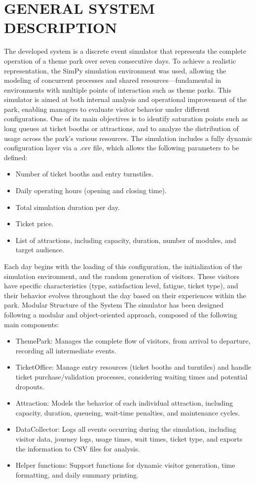 \documentclass[12pt]{article}
\begin{document}
\section{GENERAL SYSTEM DESCRIPTION}
The developed system is a discrete event simulator that represents the complete operation of a theme park over seven consecutive days. To achieve a realistic representation, the SimPy simulation environment was used, allowing the modeling of concurrent processes and shared resources—fundamental in environments with multiple points of interaction such as theme parks.
This simulator is aimed at both internal analysis and operational improvement of the park, enabling managers to evaluate visitor behavior under different configurations. One of its main objectives is to identify saturation points such as long queues at ticket booths or attractions, and to analyze the distribution of usage across the park’s various resources.
The simulation includes a fully dynamic configuration layer via a .csv file, which allows the following parameters to be defined: 

\begin{itemize}
\item  Number of ticket booths and entry turnstiles.
\item  Daily operating hours (opening and closing time).
\item  Total simulation duration per day.
\item  Ticket price.
\item  List of attractions, including capacity, duration, number of modules, and target audience.
\end{itemize}

Each day begins with the loading of this configuration, the initialization of the simulation environment, and the random generation of visitors. These visitors have specific characteristics (type, satisfaction level, fatigue, ticket type), and their behavior evolves throughout the day based on their experiences within the park.
Modular Structure of the System
The simulator has been designed following a modular and object-oriented approach, composed of the following main components:

\begin{itemize}
\item  ThemePark: Manages the complete flow of visitors, from arrival to departure, recording all intermediate events.
\item  TicketOffice: Manage entry resources (ticket booths and turntiles) and handle ticket purchase/validation processes, considering waiting times and potential dropouts.
\item  Attraction: Models the behavior of each individual attraction, including capacity, duration, queueing, wait-time penalties, and maintenance cycles.
\item  DataCollector: Logs all events occurring during the simulation, including visitor data, journey logs, usage times, wait times, ticket type, and exports the information to CSV files for analysis.
\item  Helper functions: Support functions for dynamic visitor generation, time formatting, and daily summary printing.
\end{itemize}
\end{document}
